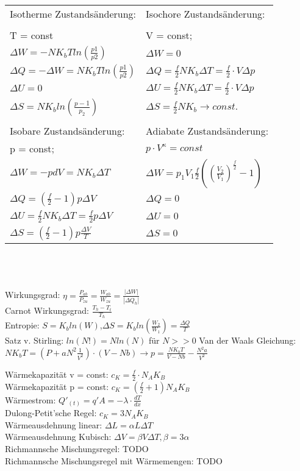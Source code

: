 \documentclass[A4]{scrreprt}
\begin{document}
    \begin{tabular}{l|l}
    Isotherme Zustandsänderung:&Isochore Zustandsänderung:\\\\
    T = const&V = const;\\
    $\Delta W = -NK_bT ln(\frac{p1}{p2})$&$\Delta W = 0$\\
    $\Delta Q = -\Delta W = NK_bT ln(\frac{p1}{p2})$&$\Delta Q = \frac{f}{2}NK_b\Delta T = \frac{f}{2}\cdot V \Delta p$\\
    $\Delta U = 0$&$\Delta U = \frac{f}{2}NK_b\Delta T = \frac{f}{2}\cdot V \Delta p$\\
    $\Delta S = NK_bln(\frac{p-1}{p_2})$&$\Delta S = \frac{f}{2} NK_b \rightarrow const.$\\\\

    Isobare Zustandsänderung:&Adiabate Zustandsänderung:\\
    p = const;&$p\cdot V^{\kappa} = const$\\
    $\Delta W = -p dV = NK_b \Delta T$&$\Delta W = p_1V_1\frac{f}{2}((\frac{V_2}{V_1})^{\frac{f}{2}}-1)$\\
    $\Delta Q = (\frac{f}{2}-1)p \Delta V$&$\Delta Q = 0$\\
    $\Delta U = \frac{f}{2}NK_b \Delta T = \frac{f}{2}p \Delta V$&$\Delta U = 0$\\
    $\Delta S = (\frac{f}{2}-1)p \frac{\Delta V}{T}$&$\Delta S = 0$\\
    \end{tabular}\\
    \\\\
    Wirkungsgrad: $\eta = \frac{P_{ab}}{P_{zu}} = \frac{W_{ab}}{W_{zu}} = \frac{|\Delta W|}{|\Delta Q_h|}$\\
    Carnot Wirkungsgrad: $\frac{T_h - T_t}{T_h}$\\
    Entropie: $S = K_bln(W)$,$\Delta S = K_bln(\frac{W_2}{W_1}) = \frac{\Delta Q}{T} $\\
    Satz v. Stirling: $ln(N!) = N ln(N)$ für $N>>0$
    Van der Waals Gleichung: $NK_bT=(P+aN^2\frac{1}{V^2})\cdot(V-Nb)\rightarrow p = \frac{NK_bT}{V-Nb}-\frac{N^2 a}{V^2}$
    
  Wärmekapazität v = const: $c_K=\frac{f}{2}\cdot N_A K_B$\\
  Wärmekapazität p = const: $c_K=(\frac{f}{2}+1)N_A K_B$\\
  Wärmestrom: $Q'_{(t)}=q'A = -\lambda\cdot\frac{dT}{dx}$\\
  Dulong-Petit'sche Regel: $c_K = 3 N_A K_B$\\
  Wärmeausdehnung linear: $\Delta L = \alpha L \Delta T$\\
  Wärmeausdehnung Kubisch: $\Delta V = \beta V \Delta T , \beta = 3\alpha$\\
  Richmannsche Mischungsregel: TODO\\
  Richmannsche Mischungsregel mit Wärmemengen: TODO\\
\end{document}
